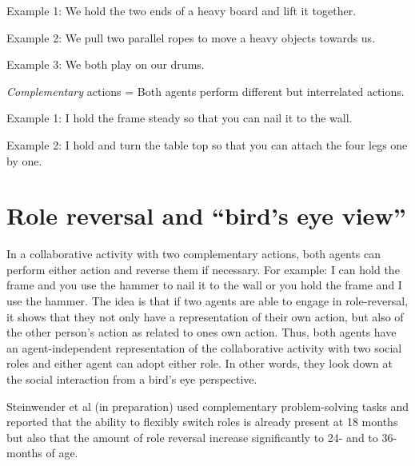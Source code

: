 \documentclass{article}
\begin{document}
Example 1: We hold the two ends of a heavy board and lift it together.

Example 2: We pull two parallel ropes to move a heavy objects towards us.

Example 3: We both play on our drums.

\textit{Complementary} actions = Both agents perform different but interrelated
actions.

Example 1: I hold the frame steady so that you can nail it to the wall.

Example 2: I hold and turn the table top so that you can attach the four legs
one by one.


\section{Role reversal and ``bird's eye view''}


In a collaborative activity with two complementary actions, both agents can
perform either action and reverse them if necessary. For example: I can hold
the frame and you use the hammer to nail it to the wall or you hold the frame
and I use the hammer. The idea is that if two agents are able to engage in
role-reversal, it shows that they not only have a representation of their own
action, but also of the other person's action as related to ones own action.
Thus, both agents have an agent-independent representation of the collaborative
activity with two social roles and either agent can adopt either role. In other
words, they look down at the social interaction from a bird's eye perspective.

Steinwender et al (in preparation) used complementary problem-solving tasks and
reported that the ability to flexibly switch roles is already present at 18
months but also that the amount of role reversal increase significantly to 24-
and  to 36-months of age.
\end{document}
